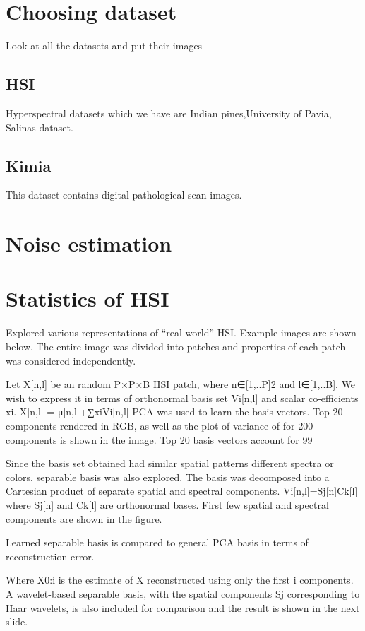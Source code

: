 \documentclass{article}
\begin{document}
\section{Choosing dataset}

Look at all the datasets and put their images

\subsection{HSI}
Hyperspectral datasets which we have are Indian pines,University of Pavia, Salinas dataset.

\subsection{Kimia}

This dataset contains digital pathological scan images.  
\section{Noise estimation}

\section{Statistics of HSI}

Explored various representations of “real-world” HSI. Example images are shown below. The entire image was divided into patches and properties of each patch was considered independently.

Let X[n,l] be an random P×P×B HSI patch, where n∈[1,..P]2 and l∈[1,..B]. 
We wish to express it in terms of orthonormal basis set Vi[n,l] and scalar co-efficients xi.
X[n,l] = μ[n,l]+∑xiVi[n,l]
PCA was used to learn the basis vectors.
Top 20 components rendered in RGB, as well as the plot of variance of for 200 components  is shown in the image.
Top 20 basis vectors account for 99%

Since the basis set obtained had similar spatial patterns different spectra or colors, separable basis was also explored. The basis was decomposed into a Cartesian product of separate spatial and spectral components.
Vi[n,l]=Sj[n]Ck[l] where Sj[n] and Ck[l] are orthonormal bases.
First few spatial and spectral components are shown in the figure.


Learned separable basis is compared to general PCA basis in terms of reconstruction error.  

Where X0:i is the estimate of X reconstructed using only the first i components.
A wavelet-based separable basis, with the spatial components Sj corresponding to Haar wavelets, is also included for comparison and the result is shown in the next slide. 
\end{document}
